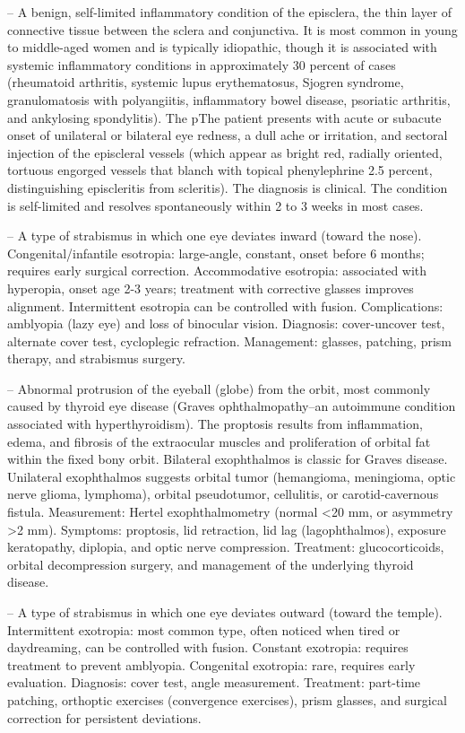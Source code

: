 -- A benign, self-limited inflammatory condition of the episclera, the thin layer of connective tissue between the sclera and conjunctiva. It is most common in young to middle-aged women and is typically idiopathic, though it is associated with systemic inflammatory conditions in approximately 30 percent of cases (rheumatoid arthritis, systemic lupus erythematosus, Sjogren syndrome, granulomatosis with polyangiitis, inflammatory bowel disease, psoriatic arthritis, and ankylosing spondylitis). The pThe patient presents with acute or subacute onset of unilateral or bilateral eye redness, a dull ache or irritation, and sectoral injection of the episcleral vessels (which appear as bright red, radially oriented, tortuous engorged vessels that blanch with topical phenylephrine 2.5 percent, distinguishing episcleritis from scleritis). The diagnosis is clinical. The condition is self-limited and resolves spontaneously within 2 to 3 weeks in most cases.

-- A type of strabismus in which one eye deviates inward (toward the nose). Congenital/infantile esotropia: large-angle, constant, onset before 6 months; requires early surgical correction. Accommodative esotropia: associated with hyperopia, onset age 2-3 years; treatment with corrective glasses improves alignment. Intermittent esotropia can be controlled with fusion. Complications: amblyopia (lazy eye) and loss of binocular vision. Diagnosis: cover-uncover test, alternate cover test, cycloplegic refraction. Management: glasses, patching, prism therapy, and strabismus surgery.

-- Abnormal protrusion of the eyeball (globe) from the orbit, most commonly caused by thyroid eye disease (Graves ophthalmopathy--an autoimmune condition associated with hyperthyroidism). The proptosis results from inflammation, edema, and fibrosis of the extraocular muscles and proliferation of orbital fat within the fixed bony orbit. Bilateral exophthalmos is classic for Graves disease. Unilateral exophthalmos suggests orbital tumor (hemangioma, meningioma, optic nerve glioma, lymphoma), orbital pseudotumor, cellulitis, or carotid-cavernous fistula. Measurement: Hertel exophthalmometry (normal <20 mm, or asymmetry >2 mm). Symptoms: proptosis, lid retraction, lid lag (lagophthalmos), exposure keratopathy, diplopia, and optic nerve compression. Treatment: glucocorticoids, orbital decompression surgery, and management of the underlying thyroid disease.

-- A type of strabismus in which one eye deviates outward (toward the temple). Intermittent exotropia: most common type, often noticed when tired or daydreaming, can be controlled with fusion. Constant exotropia: requires treatment to prevent amblyopia. Congenital exotropia: rare, requires early evaluation. Diagnosis: cover test, angle measurement. Treatment: part-time patching, orthoptic exercises (convergence exercises), prism glasses, and surgical correction for persistent deviations.

